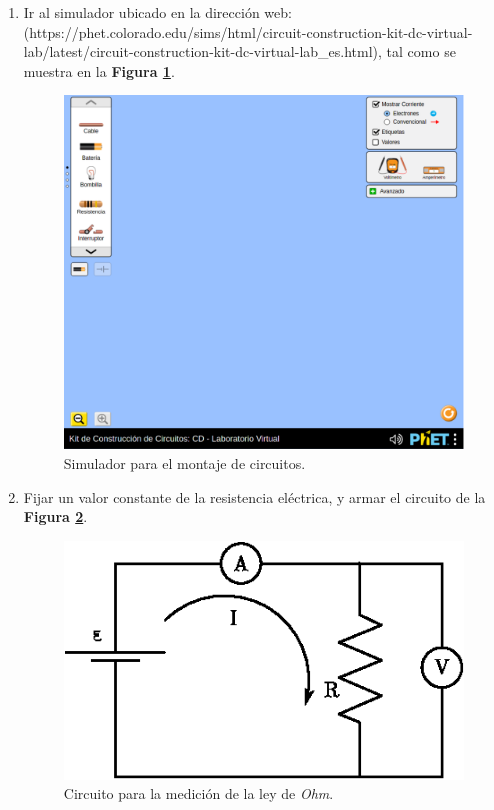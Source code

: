 \documentclass[letter,11pt]{article}
\begin{document}
\begin{enumerate}
\item Ir al simulador ubicado en la dirección web:
(https://phet.colorado.edu/sims/html/circuit-construction-kit-dc-virtual-lab/latest/circuit-construction-kit-dc-virtual-lab\_es.html),
tal como se muestra en la \textbf{Figura \ref{figura1}}.

\begin{figure}[!h]
\centering
\includegraphics[scale=0.40]{resources/figura1.eps}
\caption{Simulador para el montaje de circuitos.}
\label{figura1}
\end{figure}

\item Fijar un valor constante de la resistencia eléctrica, y armar el circuito
de la \textbf{Figura \ref{figura2}}.

\begin{figure}[!h]
\centering
\includegraphics[scale=1.00]{resources/figura2.eps}
\caption{Circuito para la medición de la ley de \emph{Ohm}.}
\label{figura2}
\end{figure}


\end{enumerate}
\end{document}
